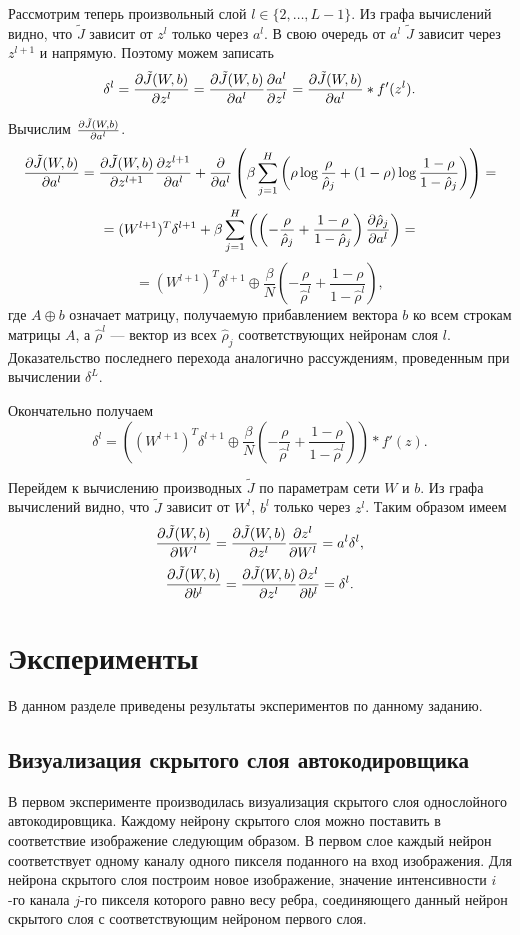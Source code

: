 \documentclass[12pt]{article}
\begin{document}
		Рассмотрим теперь произвольный слой $l \in \{2, \ldots, L-1\}$. Из графа вычислений видно, что $\tilde J$ зависит от $z^l$ только через $a^l$. В свою очередь от $a^l$ $\tilde J$ зависит через $z^{l+1}$ и напрямую. Поэтому можем записать
		$$\delta^l = \frac{\partial \tilde J(W, b)}{\partial z^l} = \frac{\partial \tilde J(W, b)}{\partial a^l} \frac{\partial a^l}{\partial z^l} = \frac{\partial \tilde J(W, b)}{\partial a^l} * f'(z^l).$$

		Вычислим $\frac{\partial \tilde J(W, b)}{\partial a^l}$. 
		$$\frac{\partial \tilde J(W, b)}{\partial a^l} = \frac{\partial \tilde J(W, b)}{\partial z^{l+1}} \frac{\partial z^{l+1}}{\partial a^l} + \frac{\partial }{\partial a^l} \left( \beta \sum_{j=1}^{H} \left(\rho \log\frac{\rho}{\hat\rho_j} + (1 - \rho)\log\frac{1 - \rho}{1 - \hat \rho_j} \right)\right) =$$
		$$ = (W^{l+1})^T \delta^{l+1} + \beta \sum_{j=1}^{H} \left( \left( -\frac{\rho}{\hat\rho_j} + \frac{1 - \rho}{1 - \hat \rho_j} \right) \frac{\partial \hat \rho_j}{\partial a^l} \right) = $$
		$$ = (W^{l+1})^T\delta^{l+1} \oplus \frac \beta N \left( -\frac{\rho}{\hat\rho^l} + \frac{1 - \rho}{1 - \hat \rho^l} \right),$$
		где $A \oplus b$ означает матрицу, получаемую прибавлением вектора $b$ ко всем строкам матрицы $A$, а $\hat\rho^l$ — вектор из всех $\hat\rho_j$ соответствующих нейронам слоя $l$. Доказательство последнего перехода аналогично рассуждениям, проведенным при вычислении $\delta^L$.

		Окончательно получаем 
		$$\delta^l = \left((W^{l+1})^T \delta^{l+1} \oplus  \frac \beta N \left( -\frac{\rho}{\hat\rho^l} + \frac{1 - \rho}{1 - \hat \rho^l}\right)\right) * f'(z).$$

		Перейдем к вычислению производных $\tilde J$ по параметрам сети $W$ и $b$. Из графа вычислений видно, что $\tilde J$ зависит от $W^l$, $b^l$ только через $z^l$. Таким образом имеем
		$$\frac{\partial \tilde J(W, b)}{\partial W^l} = \frac{\partial \tilde J(W, b)}{\partial z^l} \frac{\partial z^l}{\partial W^l} = a^l \delta^l,$$
		$$\frac{\partial \tilde J(W, b)}{\partial b^l} = \frac{\partial \tilde J(W, b)}{\partial z^l} \frac{\partial z^l}{\partial b^l} = \delta^l.$$


\section{Эксперименты}
	\hspace{0.6cm}В данном разделе приведены результаты экспериментов по данному заданию.

	\subsection{Визуализация скрытого слоя автокодировщика}
		\hspace{0.5cm}В первом эксперименте производилась визуализация скрытого слоя однослойного автокодировщика. Каждому нейрону скрытого слоя можно поставить в соответствие изображение следующим образом. В первом слое каждый нейрон соответствует одному каналу одного пикселя поданного на вход изображения. Для нейрона скрытого слоя построим новое изображение, значение интенсивности $i$-го канала $j$-го пикселя которого равно весу ребра, соединяющего данный нейрон скрытого слоя с соответствующим нейроном первого слоя.
\end{document}
